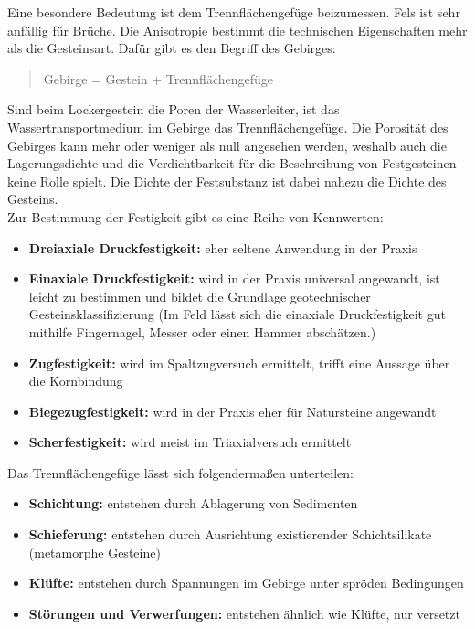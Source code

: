 \documentclass[12pt,a4paper,draft]{scrartcl} %
\begin{document}
Eine besondere Bedeutung ist dem Trennflächengefüge beizumessen. Fels ist sehr anfällig für Brüche. Die Anisotropie bestimmt die technischen Eigenschaften mehr als die Gesteinsart. Dafür gibt es den Begriff des Gebirges:

\begin{quote}
Gebirge = Gestein + Trennflächengefüge
\end{quote}

Sind beim Lockergestein die Poren der Wasserleiter, ist das Wassertransportmedium im Gebirge das Trennflächengefüge. Die Porosität des Gebirges kann mehr oder weniger als null angesehen werden, weshalb auch die Lagerungsdichte und die Verdichtbarkeit für die Beschreibung von Festgesteinen keine Rolle spielt. Die Dichte der Festsubstanz ist dabei nahezu die Dichte des Gesteins.\\
Zur Bestimmung der Festigkeit gibt es eine Reihe von Kennwerten:
\begin{itemize}
\item \textbf{Dreiaxiale Druckfestigkeit:} eher seltene Anwendung in der Praxis
\item \textbf{Einaxiale Druckfestigkeit:} wird in der Praxis universal angewandt, ist leicht zu bestimmen und bildet die Grundlage geotechnischer Gesteinsklassifizierung (Im Feld lässt sich die einaxiale Druckfestigkeit gut mithilfe Fingernagel, Messer oder einen Hammer abschätzen.)
\item \textbf{Zugfestigkeit:} wird im Spaltzugversuch ermittelt, trifft eine Aussage über die Kornbindung
\item \textbf{Biegezugfestigkeit:} wird in der Praxis eher für Natursteine angewandt
\item \textbf{Scherfestigkeit:} wird meist im Triaxialversuch ermittelt
\end{itemize}

Das Trennflächengefüge lässt sich folgendermaßen unterteilen:
\begin{itemize}
\item \textbf{Schichtung:} entstehen durch Ablagerung von Sedimenten
\item \textbf{Schieferung:} entstehen durch Ausrichtung existierender Schichtsilikate (metamorphe Gesteine)
\item \textbf{Klüfte:} entstehen durch Spannungen im Gebirge unter spröden Bedingungen
\item \textbf{Störungen und Verwerfungen:} entstehen ähnlich wie Klüfte, nur versetzt
\end{itemize}
\end{document}
